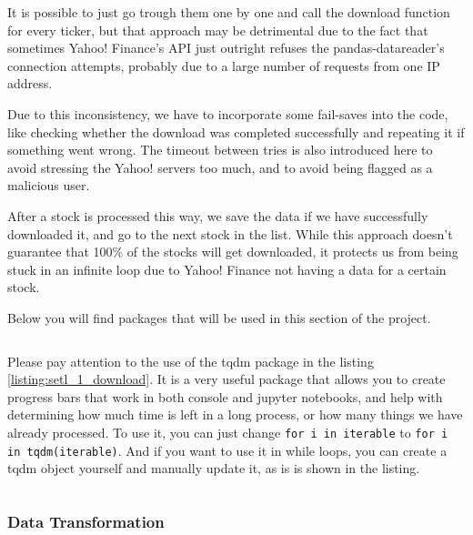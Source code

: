 \documentclass[12pt, a4paper]{article}
\begin{document}
It is possible to just go trough them one by one and call the download function for every ticker, but that approach may be detrimental due to the fact that sometimes Yahoo! Finance’s API  just outright refuses the pandas-datareader’s connection attempts, probably due to a large number of requests from one IP address.

Due to this inconsistency, we have to incorporate some fail-saves into the code, like checking whether the download was completed successfully and repeating it if something went wrong. The timeout between tries is also introduced here to avoid stressing the Yahoo! servers too much, and to avoid being flagged as a malicious user.

After a stock is processed this way, we save the data if we have successfully downloaded it, and go to the next stock in the list. While this approach doesn’t guarantee that 100\% of the stocks will get downloaded, it protects us from being stuck in an infinite loop due to Yahoo! Finance not having a data for a certain stock.


Below you will find packages that will be used in this section of the project.

\bgroup
  \inputminted[linenos, breaklines=true, fontsize=\scriptsize, firstnumber=last]{python}{src/stocks/etl/0a_imports.py}
  \label{listing:setl_0a_imports}
\egroup



Please pay attention to the use of the tqdm package in the listing \ref{listing:setl_1_download}. It is a very useful package that allows you to create progress bars that work in both console and jupyter notebooks, and help with determining how much time is left in a long process, or how many things we have already processed. To use it, you can just change \texttt{for i in iterable} to \texttt{for i in tqdm(iterable)}. And if you want to use it in while loops, you can create a tqdm object yourself and manually update it, as is is shown in the listing.

\bgroup
  \inputminted[linenos, breaklines=true, fontsize=\scriptsize]{python}{src/stocks/etl/1_download.py}
  \label{listing:setl_1_download}
\egroup

\subsubsection{Data Transformation}
\end{document}
